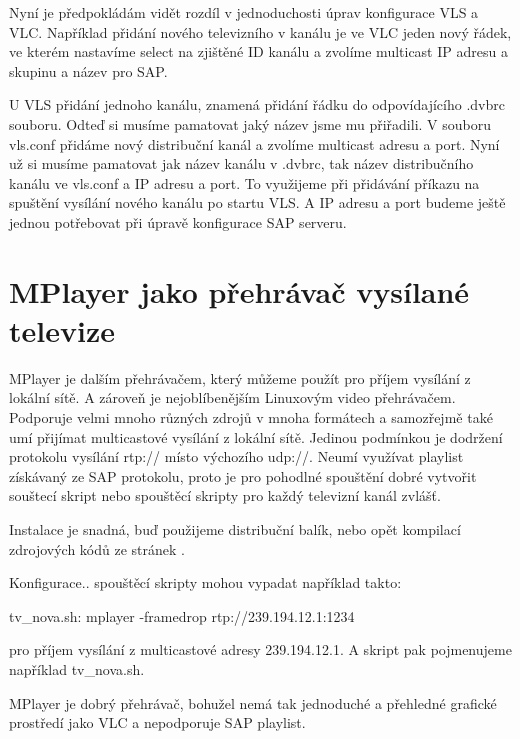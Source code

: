 \vspace{10pt}

Nyní je předpokládám vidět rozdíl v jednoduchosti úprav konfigurace VLS a VLC. Například přidání nového televizního v kanálu je ve VLC jeden nový řádek, ve kterém nastavíme select na zjištěné ID kanálu a zvolíme multicast IP adresu a skupinu a název pro SAP.

U VLS přidání jednoho kanálu, znamená přidání řádku do odpovídajícího .dvbrc souboru. Odteď si musíme pamatovat jaký název jsme mu přiřadili. V souboru vls.conf přidáme nový distribuční kanál a zvolíme multicast adresu a port. Nyní už si musíme pamatovat jak název kanálu v .dvbrc, tak název distribučního kanálu ve vls.conf a IP adresu a port. To využijeme při přidávání příkazu na spuštění vysílání nového kanálu po startu VLS. A IP adresu a port budeme ještě jednou potřebovat při úpravě konfigurace SAP serveru.

\vspace{10pt}

\section {MPlayer jako přehrávač vysílané televize}

MPlayer je dalším přehrávačem, který můžeme použít pro příjem vysílání z lokální sítě. A zároveň je nejoblíbenějším Linuxovým video přehrávačem. Podporuje velmi mnoho různých zdrojů v mnoha formátech a samozřejmě také umí přijímat multicastové vysílání z lokální sítě. Jedinou podmínkou je dodržení protokolu vysílání rtp:// místo výchozího udp://. Neumí využívat playlist získávaný ze SAP protokolu, proto je pro pohodlné spouštění dobré vytvořit souštecí skript nebo spouštěcí skripty pro každý televizní kanál zvlášť.

\vspace{10pt}

Instalace je snadná, buď použijeme distribuční balík, nebo opět kompilací zdrojových kódů ze stránek \cite{mplayerURL}. 

\vspace{10pt}

Konfigurace.. spouštěcí skripty mohou vypadat například takto:

tv\_nova.sh: mplayer -framedrop rtp://239.194.12.1:1234

pro příjem vysílání z multicastové adresy 239.194.12.1. A skript pak pojmenujeme například tv\_nova.sh.

\vspace{10pt}

MPlayer je dobrý přehrávač, bohužel nemá tak jednoduché a přehledné grafické prostředí jako VLC a nepodporuje SAP playlist.
